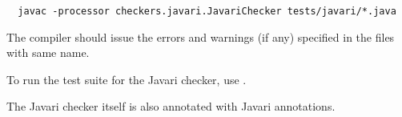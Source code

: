 \begin{Verbatim}
  javac -processor checkers.javari.JavariChecker tests/javari/*.java
\end{Verbatim}

\noindent
The compiler should issue the errors and warnings (if any) specified in the
 files with same name.

To run the test suite for the Javari checker, use .

The Javari checker itself is also annotated with Javari annotations.


